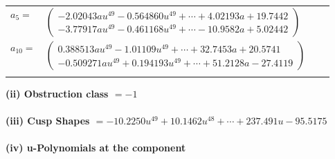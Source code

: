 \documentclass[1p]{elsarticle_modified}
\theoremstyle{definition}
\begin{document}
\begin{tabular}{m{7pt} m{180pt} m{7pt} m{180pt} }
\flushright $a_{5}=$&$\begin{pmatrix}-2.02043 a u^{49}-0.564860 u^{49}+\cdots+4.02193 a+19.7442\\-3.77917 a u^{49}-0.461168 u^{49}+\cdots-10.9582 a+5.02442\end{pmatrix}$ \\
\flushright $a_{10}=$&$\begin{pmatrix}0.388513 a u^{49}-1.01109 u^{49}+\cdots+32.7453 a+20.5741\\-0.509271 a u^{49}+0.194193 u^{49}+\cdots+51.2128 a-27.4119\end{pmatrix}$\\&\end{tabular}
\flushleft \textbf{(ii) Obstruction class $= -1$}\\~\\
\flushleft \textbf{(iii) Cusp Shapes $= -10.2250 u^{49}+10.1462 u^{48}+\cdots+237.491 u-95.5175$}\\~\\
\newpage\renewcommand{\arraystretch}{1}
\flushleft \textbf{(iv) u-Polynomials at the component}\newline \\
\end{document}

